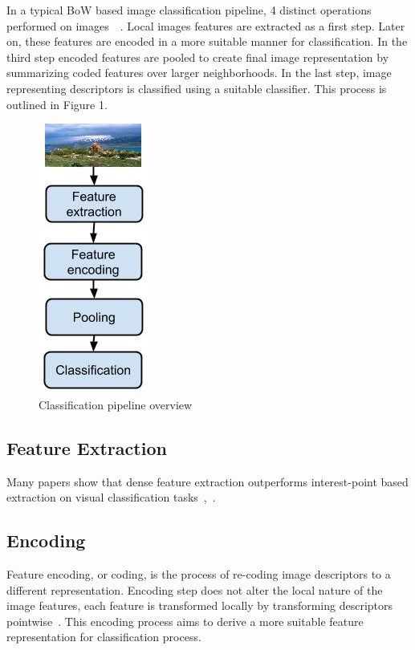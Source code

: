 \documentclass[conference]{IEEEtran}
\begin{document}
In a typical BoW based image classification pipeline, 4 distinct operations performed on images~\cite{6248076}~\cite{5206757}. Local images features are extracted as a first step. Later on, these features are encoded in a more suitable manner for classification. In the third step encoded features are pooled to create final image representation by summarizing coded features over larger neighborhoods. In the last step, image representing descriptors is classified using a suitable classifier. This process is outlined in Figure 1.

\begin{figure}[h]
\centering
\includegraphics[scale=0.5]{data/classification_pipeline.jpg}
\caption{Classification pipeline overview}
\label{figure1}
\end{figure}

\subsection{Feature Extraction}

Many papers show that dense feature extraction outperforms interest-point based extraction on visual classification tasks~\cite{1641019},~\cite{1541309}.

\subsection{Encoding}

Feature encoding, or coding, is the process of re-coding image descriptors to a different representation. Encoding step does not alter the local nature of the image features, each feature is transformed locally by transforming descriptors pointwise~\cite{5539963}. This encoding process aims to derive a more suitable feature representation for classification process.
\end{document}
